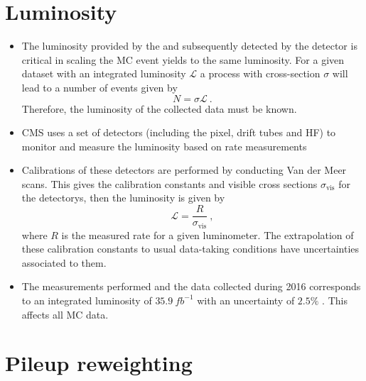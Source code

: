 \section{Luminosity}

\begin{itemize}
    \item The luminosity provided by the \LHC and subsequently detected by the \CMS detector is critical in scaling the MC event yields to the same luminosity. For a given dataset with an integrated luminosity $\mathcal{L}$ a process with cross-section $\sigma$ will lead to a number of events given by
    \begin{equation}
        N = \sigma \mathcal{L}\ .
    \end{equation}
    Therefore, the luminosity of the collected data must be known.
    \item CMS uses a set of detectors (including the pixel, drift tubes and HF) to monitor and measure the luminosity based on rate measurements
    \item Calibrations of these detectors are performed by conducting Van der Meer scans. This gives the calibration constants and visible cross sections $\sigma_{\mathrm{vis}}$ for the detectorys, then the luminosity is given by
    \begin{equation}
        \mathcal{L} = \frac{R}{\sigma_{\mathrm{vis}}}\ ,
    \end{equation}
    where $R$ is the measured rate for a given luminometer. The extrapolation of these calibration constants to usual data-taking conditions have uncertainties associated to them.
    \item The measurements performed and the data collected during 2016 corresponds to an integrated luminosity of $\SI{35.9}{fb^{-1}}$ with an uncertainty of $2.5\%$ \cite{CMS:2017sdi}. This affects all MC data.
\end{itemize}


\section{Pileup reweighting}

